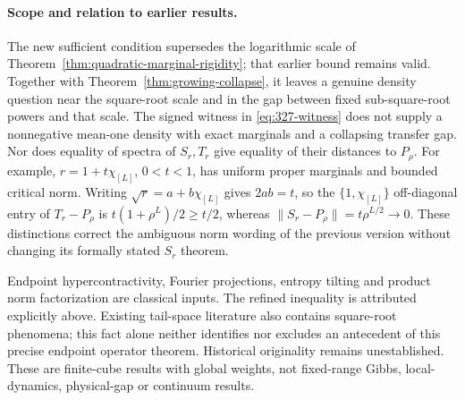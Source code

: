 \paragraph{Scope and relation to earlier results.}
The new sufficient condition supersedes the logarithmic scale of
Theorem~\ref{thm:quadratic-marginal-rigidity}; that earlier bound remains
valid. Together with Theorem~\ref{thm:growing-collapse}, it leaves a
genuine density question near the square-root scale and in the gap
between fixed sub-square-root powers and that scale. The signed witness
in \eqref{eq:327-witness} does not supply a nonnegative mean-one density
with exact marginals and a collapsing transfer gap. Nor does equality
of spectra of $S_r,T_r$ give equality of their distances to $P_\rho$.
For example, $r=1+t\chi_{[L]}$, $0<t<1$, has uniform proper marginals
and bounded critical norm. Writing $\sqrt r=a+b\chi_{[L]}$ gives
$2ab=t$, so the $\{1,\chi_{[L]}\}$ off-diagonal entry of
$T_r-P_\rho$ is $t(1+\rho^L)/2\geq t/2$, whereas
$\|S_r-P_\rho\|=t\rho^{L/2}\to0$.
These distinctions correct the ambiguous norm wording of the previous
version without changing its formally stated $S_r$ theorem.

Endpoint hypercontractivity, Fourier projections, entropy tilting and
product norm factorization are classical inputs. The refined inequality
is attributed explicitly above. Existing tail-space literature also
contains square-root phenomena; this fact alone neither identifies nor
excludes an antecedent of this precise endpoint operator theorem.
Historical originality remains unestablished. These are finite-cube
results with global weights, not fixed-range Gibbs, local-dynamics,
physical-gap or continuum results.
